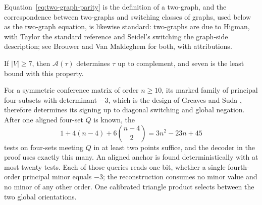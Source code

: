 Equation~\eqref{eq:two-graph-parity} is the definition of a two-graph, and the
correspondence between two-graphs and switching classes of graphs, used below
as the two-graph equation, is likewise standard: two-graphs are due to Higman,
with Taylor the standard reference and Seidel's switching the graph-side
description; see Brouwer and Van Maldeghem \cite[\S1.1.12]{BrouwerVanMaldeghem}
for both, with attributions.

\begin{theorem}
\label{thm:aligned-faithfulness}
If \(|V|\geq7\), then \(\mathcal A(\tau)\) determines \(\tau\) up to
complement, and seven is the least bound with this property.

For a symmetric conference matrix of order \(n\geq10\), its marked family of
principal four-subsets with determinant \(-3\), which is the design of
Greaves and Suda \cite[Table~1 and Example~2.3]{GreavesSuda}, therefore
determines its signing up to diagonal switching and global negation.  After
one aligned four-set \(Q\) is known, the
\[
 1+4(n-4)+6\binom{n-4}{2}=3n^2-23n+45
\]
tests on four-sets meeting \(Q\) in at least two points suffice, and the
decoder in the proof uses exactly this many.  An aligned anchor is found
deterministically with at most twenty tests.  Each of those queries reads one
bit, whether a single fourth-order principal minor equals \(-3\); the
reconstruction consumes no minor value and no minor of any other order.
One calibrated triangle product selects between the two global orientations.
\end{theorem}

